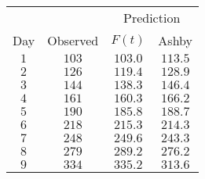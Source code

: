 \begin{tabular}{cccc}                            \toprule
    &          & \multicolumn{2}{c}{Prediction} \\
  \cmidrule{3-4}
Day & Observed & $F(t)$    & Ashby   \\\midrule
$1$ & $103$    & $103.0$   & $113.5$ \\
$2$ & $126$    & $119.4$   & $128.9$ \\
$3$ & $144$    & $138.3$   & $146.4$ \\
$4$ & $161$    & $160.3$   & $166.2$ \\
$5$ & $190$    & $185.8$   & $188.7$ \\
$6$ & $218$    & $215.3$   & $214.3$ \\
$7$ & $248$    & $249.6$   & $243.3$ \\
$8$ & $279$    & $289.2$   & $276.2$ \\
$9$ & $334$    & $335.2$   & $313.6$ \\\bottomrule
\end{tabular}
